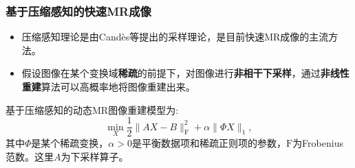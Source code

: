 \documentclass{beamer}
\begin{document}
\begin{frame}
	\frametitle{基于压缩感知的快速MR成像}
	\begin{itemize}
		\item 压缩感知理论是由Candès等提出的采样理论，是目前快速MR成像的主流方法。
		\item 假设图像在某个变换域\textbf{稀疏}的前提下，对图像进行\textbf{非相干下采样}，通过\textbf{非线性重建}算法可以高概率地将图像重建出来。
	\end{itemize}

基于压缩感知的动态MR图像重建模型为:
	\begin{equation}
	\min_X \frac{1}{2}\|AX-B\|_{\mathrm{F}}^2+\alpha\|\Phi X\|_1,
	\end{equation}
其中$\Phi$是某个稀疏变换，$\alpha>0$是平衡数据项和稀疏正则项的参数，$\mathrm{F}$为Frobenius范数。这里$A$为下采样算子。

\end{frame}
\end{document}
